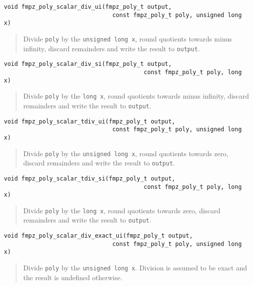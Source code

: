 \documentclass[a4paper,10pt]{article}
\newcommand{\code}{\lstinline}
\begin{document}
\begin{lstlisting}
void fmpz_poly_scalar_div_ui(fmpz_poly_t output, 
                               const fmpz_poly_t poly, unsigned long x)
\end{lstlisting}
\begin{quote}
Divide \code{poly} by the \code{unsigned long x}, round quotients towards minus infinity, discard remainders and write the result to \code{output}. 
\end{quote}

\begin{lstlisting}
void fmpz_poly_scalar_div_si(fmpz_poly_t output, 
                                        const fmpz_poly_t poly, long x)
\end{lstlisting}
\begin{quote}
Divide \code{poly} by the \code{long x}, round quotients towards minus infinity, discard remainders and write the result to \code{output}.
\end{quote}

\begin{lstlisting}
void fmpz_poly_scalar_tdiv_ui(fmpz_poly_t output, 
                               const fmpz_poly_t poly, unsigned long x)
\end{lstlisting}
\begin{quote}
Divide \code{poly} by the \code{unsigned long x}, round quotients towards zero, discard remainders and write the result to \code{output}.
\end{quote}

\begin{lstlisting}
void fmpz_poly_scalar_tdiv_si(fmpz_poly_t output, 
                                        const fmpz_poly_t poly, long x)
\end{lstlisting}
\begin{quote}
Divide \code{poly} by the \code{long x}, round quotients towards zero, discard remainders and write the result to \code{output}.
\end{quote}

\begin{lstlisting}
void fmpz_poly_scalar_div_exact_ui(fmpz_poly_t output, 
                               const fmpz_poly_t poly, unsigned long x)
\end{lstlisting}
\begin{quote}
Divide \code{poly} by the \code{unsigned long x}. Division is assumed to be exact and the result is undefined otherwise.
\end{quote}
\end{document}
